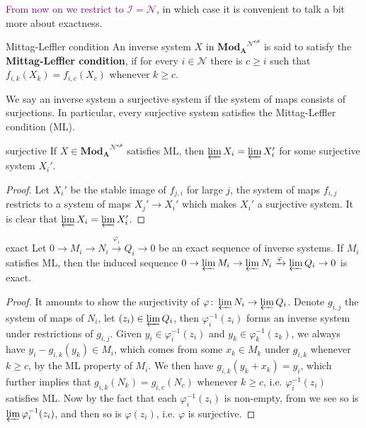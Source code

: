 \documentclass[10pt]{extarticle}
\begin{document}
\textcolor{purple}{From now on we restrict to $\mathcal{I}=\mathcal{N}$}, in which case it is convenient to talk a bit more about exactness.

\begin{definition}{Mittag-Leffler condition}{}
    An inverse system $X$ in $\mathbf{Mod_A}^{\mathcal{{N}^\text{op}}}$ is said to satisfy the \textbf{Mittag-Leffler condition}, if for every $i\in\mathcal{{N}}$ there is $c\geq i$ such that $f_{i,k}(X_k)=f_{i,c}(X_c)$ whenever $k\geq c$. 
\end{definition}

We say an inverse system a surjective system if the system of maps consists of surjections. In particular, every surjective system satisfies the Mittag-Leffler condition (ML).

\begin{lemma}{}{surjective}
    If $X\in\mathbf{Mod_A}^{\mathcal{{N}^\text{op}}}$ satisfies ML, then $\varprojlim X_i=\varprojlim X_i'$ for some surjective system $X_i'$.
\end{lemma}
\begin{proof}
    Let $X_i'$ be the stable image of $f_{j,i}$ for large $j$, the system of maps $f_{i,j}$ restricts to a system of maps $X_j'\to X_i'$ which makes $X_i'$ a surjective system. It is clear that $\varprojlim X_i=\varprojlim X_i'$.
\end{proof}

\begin{proposition}{}{exact}
    Let $0\to M_i\to N_i\xrightarrow{\varphi_i} Q_i\to 0$ be an exact sequence of inverse systems. If $M_i$ satisfies ML, then the induced sequence $0\to \varprojlim M_i\to \varprojlim N_i\xrightarrow{\varphi} \varprojlim Q_i\to 0$ is exact.
\end{proposition}
\begin{proof}
    It amounts to show the surjectivity of $\varphi\colon\varprojlim N_i\to \varprojlim Q_i$. Denote $g_{i,j}$ the system of maps of $N_i$, let $(z_i)\in\varprojlim Q_i$, then $\varphi_i^{-1}(z_i)$ forms an inverse system under restrictions of $g_{i,j}$. Given $y_i\in \varphi_i^{-1}(z_i)$ and $y_k\in \varphi_k^{-1}(z_k)$, we always have $y_i-g_{i,k}(y_k)\in M_i$, which comes from some $x_k\in M_k$ under $g_{i,k}$ whenever $k\geq c$, by the ML property of $M_i$. We then have $g_{i,k}(y_k+x_k)=y_i$, which further implies that $g_{i,k}(N_k)=g_{i,c}(N_c)$ whenever $k\geq c$, i.e. $\varphi_i^{-1}(z_i)$ satisfies ML. Now by the fact that each $\varphi_i^{-1}(z_i)$ is non-empty, from  we see so is $\varprojlim \varphi_i^{-1}(z_i)$, and then so is $\varphi(z_i)$, i.e. $\varphi$ is surjective.
\end{proof}
\end{document}
